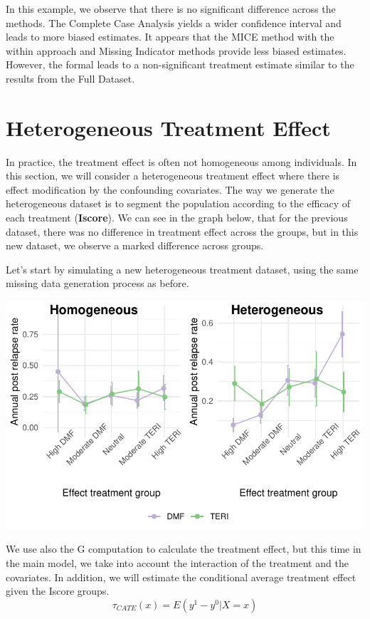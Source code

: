 \documentclass[
  letterpaper,
  DIV=11,
  numbers=noendperiod]{scrreprt}
\begin{document}
In this example, we observe that there is no significant difference
across the methods. The Complete Case Analysis yields a wider confidence
interval and leads to more biased estimates. It appears that the MICE
method with the within approach and Missing Indicator methods provide
less biased estimates. However, the formal leads to a non-significant
treatment estimate similar to the results from the Full Dataset.

\hypertarget{heterogeneous-treatment-effect}{%
\section{Heterogeneous Treatment
Effect}\label{heterogeneous-treatment-effect}}

In practice, the treatment effect is often not homogeneous among
individuals. In this section, we will consider a heterogeneous treatment
effect where there is effect modification by the confounding covariates.
The way we generate the heterogeneous dataset is to segment the
population according to the efficacy of each treatment
(\textbf{Iscore}). We can see in the graph below, that for the previous
dataset, there was no difference in treatment effect across the groups,
but in this new dataset, we observe a marked difference across groups.

Let's start by simulating a new heterogeneous treatment dataset, using
the same missing data generation process as before.

\includegraphics{chapter_09_files/figure-pdf/het-1.pdf}

We use also the G computation to calculate the treatment effect, but
this time in the main model, we take into account the interaction of the
treatment and the covariates. In addition, we will estimate the
conditional average treatment effect given the Iscore groups.
\[\tau_{CATE}(x) =E(y^1-y^0|X=x)\]
\end{document}
